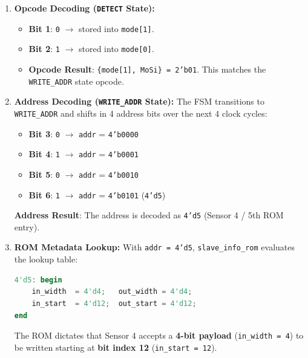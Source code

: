 \documentclass[conference]{IEEEtran}
\begin{document}
\begin{enumerate}
    \item \textbf{Opcode Decoding (\texttt{DETECT} State):}
    \begin{itemize}
        \item \textbf{Bit 1}: \texttt{0} $\rightarrow$ stored into \texttt{mode[1]}.
        \item \textbf{Bit 2}: \texttt{1} $\rightarrow$ stored into \texttt{mode[0]}.
        \item \textbf{Opcode Result}: \texttt{\{mode[1], MoSi\} = 2'b01}. This matches the \texttt{WRITE\_ADDR} state opcode.
    \end{itemize}

    \item \textbf{Address Decoding (\texttt{WRITE\_ADDR} State):}
    The FSM transitions to \texttt{WRITE\_ADDR} and shifts in 4 address bits over the next 4 clock cycles:
    \begin{itemize}
        \item \textbf{Bit 3}: \texttt{0} $\rightarrow$ \texttt{addr} = \texttt{4'b0000}
        \item \textbf{Bit 4}: \texttt{1} $\rightarrow$ \texttt{addr} = \texttt{4'b0001}
        \item \textbf{Bit 5}: \texttt{0} $\rightarrow$ \texttt{addr} = \texttt{4'b0010}
        \item \textbf{Bit 6}: \texttt{1} $\rightarrow$ \texttt{addr} = \texttt{4'b0101} (\texttt{4'd5})
    \end{itemize}
    \textbf{Address Result}: The address is decoded as \texttt{4'd5} (Sensor 4 / 5th ROM entry).

    \item \textbf{ROM Metadata Lookup:}
    With \texttt{addr = 4'd5}, \texttt{slave\_info\_rom} evaluates the lookup table:
    \begin{lstlisting}[language=Verilog]
4'd5: begin
    in_width  = 4'd4;   out_width = 4'd4;
    in_start  = 4'd12;  out_start = 4'd12;
end
    \end{lstlisting}
    The ROM dictates that Sensor 4 accepts a \textbf{4-bit payload} (\texttt{in\_width = 4}) to be written starting at \textbf{bit index 12} (\texttt{in\_start = 12}).


\end{enumerate}
\end{document}

